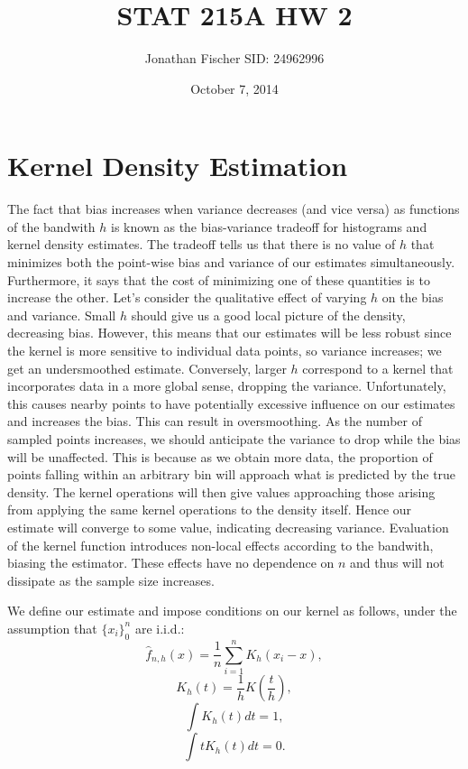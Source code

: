 \documentclass[10pt]{article} %
\title{STAT 215A HW 2}
\author{Jonathan Fischer SID: 24962996}
\date{October 7, 2014}
\begin{document}
\maketitle


\section{Kernel Density Estimation}
The fact that bias increases when variance decreases (and vice versa) as functions of the bandwith $h$ is known as the bias-variance tradeoff for histograms and kernel density estimates. The tradeoff tells us that there is no value of $h$ that minimizes both the point-wise bias and variance of our estimates simultaneously. Furthermore, it says that the cost of minimizing one of these quantities is to increase the other. Let's consider the qualitative effect of varying $h$ on the bias and variance. Small $h$ should give us a good local picture of the density, decreasing bias. However, this means that our estimates will be less robust since the kernel is more sensitive to individual data points, so variance increases; we get an undersmoothed estimate. Conversely, larger $h$ correspond to a kernel that incorporates data in a more global sense, dropping the variance. Unfortunately, this causes nearby points to have potentially excessive influence on our estimates and increases the bias. This can result in oversmoothing. As the number of sampled points increases, we should anticipate the variance to drop while the bias will be unaffected. This is because as we obtain more data, the proportion of points falling within an arbitrary bin will approach what is predicted by the true density. The kernel operations will then give values approaching those arising from applying the same kernel operations to the density itself. Hence our estimate will converge to some value, indicating decreasing variance. Evaluation of the kernel function introduces non-local effects according to the bandwith, biasing the estimator. These effects have no dependence on $n$ and thus will not dissipate as the sample size increases.

We define our estimate and impose conditions on our kernel as follows, under the assumption that $\{ x_i \}_0^n$ are i.i.d.:
\begin{equation} \hat{f}_{n,h}(x) = \frac{1}{n} \sum_{i=1}^n K_h(x_i-x), \end{equation}
\begin{equation} K_h(t)=\frac{1}{h} K(\frac{t}{h}),  \end{equation}
\begin{equation} \int K_h(t) dt =1,  \end{equation}
\begin{equation} \int t K_h(t) dt =0.  \end{equation}
\end{document}
